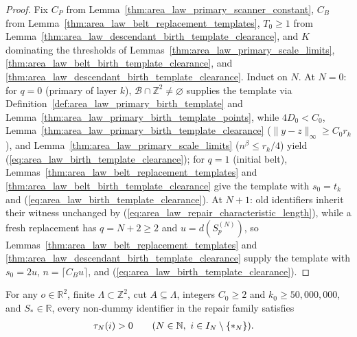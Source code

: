 \begin{proof}
    \leanok
    Fix $C_P$ from Lemma~\ref{thm:area_law_primary_scanner_constant}, $C_B$ from
    Lemma~\ref{thm:area_law_belt_replacement_templates}, $T_0\ge1$ from
    Lemma~\ref{thm:area_law_descendant_birth_template_clearance}, and $K$ dominating the
    thresholds of Lemmas~\ref{thm:area_law_primary_scale_limits},
    \ref{thm:area_law_belt_birth_template_clearance}, and
    \ref{thm:area_law_descendant_birth_template_clearance}. Induct on $N$.
    At $N=0$: for $q=0$ (primary of layer $k$), $\mathcal B\cap\mathbb Z^2\ne\varnothing$ supplies
    the template via Definition~\ref{def:area_law_primary_birth_template} and
    Lemma~\ref{thm:area_law_primary_birth_template_points}, while $4D_0<C_0$,
    Lemma~\ref{thm:area_law_primary_birth_template_clearance} ($\|y-z\|_\infty\ge C_0r_k$),
    and Lemma~\ref{thm:area_law_primary_scale_limits} ($n^\beta\le r_k/4$) yield
    (\ref{eq:area_law_birth_template_clearance}); for $q=1$ (initial belt),
    Lemmas~\ref{thm:area_law_belt_replacement_templates} and
    \ref{thm:area_law_belt_birth_template_clearance} give the template with $s_0=t_k$ and
    (\ref{eq:area_law_birth_template_clearance}).
    At $N+1$: old identifiers inherit their witness unchanged by (\ref{eq:area_law_repair_characteristic_length}),
    while a fresh replacement has $q=N+2\ge2$ and $u=d(S_p^{(N)})$, so
    Lemmas~\ref{thm:area_law_belt_replacement_templates} and
    \ref{thm:area_law_descendant_birth_template_clearance} supply the template with $s_0=2u$,
    $n=\lceil C_Bu\rceil$, and (\ref{eq:area_law_birth_template_clearance}).
\end{proof}


\begin{lemma}
    \label{thm:area_law_repair_characteristic_length_positive}
    \leanok
    For any $o\in\mathbb R^2$, finite $\Lambda\subset\mathbb Z^2$, cut $A\subseteq\Lambda$,
    integers $C_0\ge2$ and $k_0\ge50{,}000{,}000$, and $S_*\in\mathbb R$, every non-dummy
    identifier in the repair family satisfies
    \begin{align}
        \tau_N(i) & >0
        \qquad(N\in\mathbb N,\ i\in I_N\setminus\{*_N\}).\notag
    \end{align}
\end{lemma}

